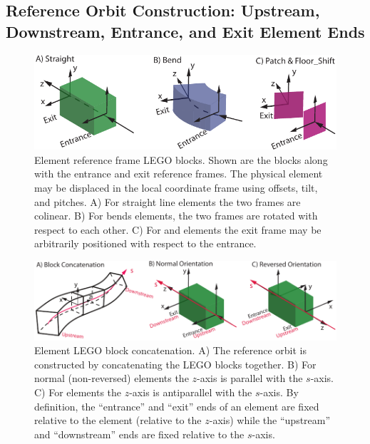 \subsection{Reference Orbit Construction: Upstream, Downstream, Entrance, and Exit Element Ends}
\label{s:ref.construct}


  \begin{figure}[tb]
  \centering
  \includegraphics{element-coord-frame.pdf}
\caption[Element LEGO blocks.]{Element reference frame LEGO
blocks. Shown are the blocks along with the entrance and exit
reference frames. The physical element may be displaced in the local
coordinate frame using offsets, tilt, and pitches. A) For straight
line elements the two frames are colinear. B) For bends elements, the
two frames are rotated with respect to each other. C) For 
and  elements the exit frame may be arbitrarily
positioned with respect to the entrance.}
  \label{f:ele.coord.frame}
  \end{figure}


\begin{figure}[tb]
  \centering
  \includegraphics{element-stream.pdf}
  \caption[Element LEGO block concatenation.]{
Element LEGO block concatenation. A) The reference orbit is
constructed by concatenating the LEGO blocks together. B) For normal
(non-reversed) elements the $z$-axis is parallel with the $s$-axis. C)
For  elements the $z$-axis is antiparallel with the
$s$-axis. By definition, the ``entrance'' and ``exit'' ends of an
element are fixed relative to the element (relative to the $z$-axis)
while the ``upstream'' and ``downstream'' ends are fixed relative to
the $s$-axis.}
  \label{f:stream}
\end{figure}

